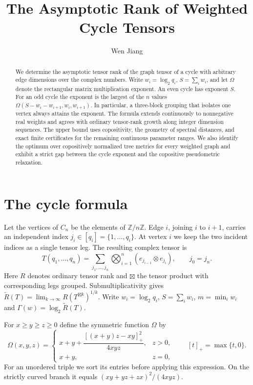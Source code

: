 \documentclass[11pt,a4paper]{article}
\title{\bfseries The Asymptotic Rank of Weighted Cycle Tensors}
\author{Wen Jiang}
\date{}
\theoremstyle{definition}
\newcommand{\Rtil}{\widetilde R}
\begin{document}
\maketitle
\begin{abstract}
We determine the asymptotic tensor rank of the graph tensor of a cycle with arbitrary edge dimensions over the complex numbers. Write \(w_i=\log_2 q_i\), \(S=\sum_iw_i\), and let \(\Omega\) denote the rectangular matrix multiplication exponent. An even cycle has exponent \(S\). For an odd cycle the exponent is the largest of the \(n\) values \(\Omega(S-w_i-w_{i+1},w_i,w_{i+1})\). In particular, a three-block grouping that isolates one vertex always attains the exponent. The formula extends continuously to nonnegative real weights and agrees with ordinary tensor-rank growth along integer dimension sequences. The upper bound uses copositivity, the geometry of spectral distances, and exact finite certificates for the remaining continuous parameter ranges. We also identify the optimum over copositively normalized tree metrics for every weighted graph and exhibit a strict gap between the cycle exponent and the copositive pseudometric relaxation.
\end{abstract}
\section{The cycle formula}\label{sec:main}

Let the vertices of \(C_n\) be the elements of \(\mathbb Z/n\mathbb Z\). Edge \(i\), joining \(i\) to \(i+1\), carries an independent index \(j_i\in[q_i]=\{1,\ldots,q_i\}\). At vertex \(i\) we keep the two incident indices as a single tensor leg. The resulting complex tensor is
\[
 T(q_1,\ldots,q_n)
 =\sum_{j_1,\ldots,j_n}\bigotimes_{i=1}^n
       (e_{j_{i-1}}\otimes e_{j_i}),\qquad j_0=j_n .
\]
Here \(R\) denotes ordinary tensor rank and \(\boxtimes\) the tensor product with corresponding legs grouped. Submultiplicativity gives
\(\Rtil(T)=\lim_{k\to\infty}R(T^{\boxtimes k})^{1/k}\).
Write \(w_i=\log_2 q_i\), \(S=\sum_i w_i\), \(m=\min_i w_i\) and
\(\Gamma(w)=\log_2\Rtil(T)\).

For \(x\ge y\ge z\ge0\) define the symmetric function \(\Omega\) by
\begin{equation}\label{eq:rect-main}
 \Omega(x,y,z)=
 \begin{cases}
 x+y+\dfrac{[(x+y)z-xy]_+^2}{4xyz},&z>0,\\[5pt]
 x+y,&z=0,
 \end{cases}
 \qquad [t]_+=\max\{t,0\}.
\end{equation}
For an unordered triple we sort its entries before applying this expression. On the strictly curved branch it equals \((xy+yz+zx)^2/(4xyz)\).
\end{document}
